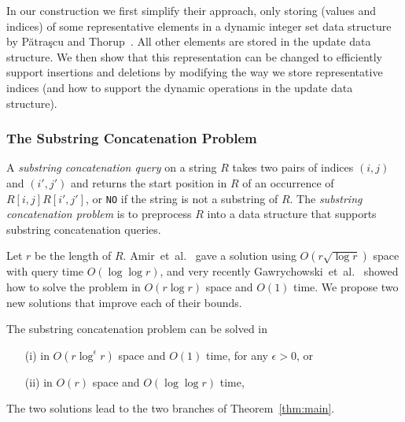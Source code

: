 In our construction we first simplify their approach,
only storing (values and indices) of some representative elements in a dynamic integer set data structure by Pătraşcu and Thorup~\cite{patrascu2014dynamic}. All other elements are stored in the update data structure. We then show that this representation can be changed to efficiently support insertions and deletions by modifying the way we store representative indices (and how to support the dynamic operations in the update data structure). 


\subsubsection{The Substring Concatenation Problem}
A \emph{substring concatenation query} on a string $R$ takes two pairs of indices $(i,j)$ and $(i',j')$ and returns the start position in $R$ of an occurrence of $R[i,j] R[i',j']$, or \texttt{NO} if the string is not a substring of $R$. The \emph{substring concatenation problem} is to preprocess $R$ into a data structure that supports substring concatenation queries.


Let $r$ be the length of $R$. Amir~et~al.~\cite{amir2007dynamic} gave a solution using $O(r\sqrt{\log r})$ space with query time $O(\log\log r)$, and very recently Gawrychowski~et~al.~\cite{gawrychowski2014weighted} showed how to solve the problem in $O(r\log r)$ space and $O(1)$ time. We propose two new solutions that improve each of their bounds.

\begin{theorem}\label{thm:substringconcat}
The substring concatenation problem can be solved in
\begin{itemize}
\item[(i)] in $O(r\log^\epsilon r)$ space and $O(1)$ time, for any $\epsilon>0$, or
\item[(ii)] in $O(r)$ space and $O(\log \log r)$ time,
\end{itemize}
\end{theorem}

\noindent The two solutions lead to the two branches of Theorem~\ref{thm:main}.


